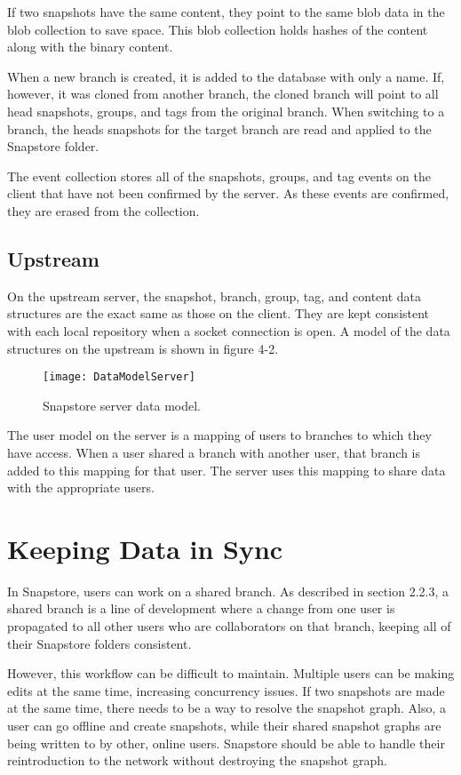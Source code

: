 If two snapshots have the same content, they point to the same blob data in the blob collection to save space. This blob collection holds hashes of the content along with the binary content.

When a new branch is created, it is added to the database with only a name. If, however, it was cloned from another branch, the cloned branch will point to all head snapshots, groups, and tags from the original branch. When switching to a branch, the heads snapshots for the target branch are read and applied to the Snapstore folder.

The event collection stores all of the snapshots, groups, and tag events on the client that have not been confirmed by the server. As these events are confirmed, they are erased from the collection.

\subsection{Upstream}

On the upstream server, the snapshot, branch, group, tag, and content data structures are the exact same as those on the client. They are kept consistent with each local repository when a socket connection is open. A model of the data structures on the upstream is shown in figure 4-2.

\begin{figure}
\texttt{[image: DataModelServer]}
\caption{Snapstore server data model.}
\label{arm:fig1}
\end{figure}

The user model on the server is a mapping of users to branches to which they have access. When a user shared a branch with another user, that branch is added to this mapping for that user. The server uses this mapping to share data with the appropriate users.

\section{Keeping Data in Sync}

In Snapstore, users can work on a shared branch. As described in section 2.2.3, a shared branch is a line of development where a change from one user is propagated to all other users who are collaborators on that branch, keeping all of their Snapstore folders consistent.

However, this workflow can be difficult to maintain. Multiple users can be making edits at the same time, increasing concurrency issues. If two snapshots are made at the same time, there needs to be a way to resolve the snapshot graph. Also, a user can go offline and create snapshots, while their shared snapshot graphs are being written to by other, online users. Snapstore should be able to handle their reintroduction to the network without destroying the snapshot graph.

